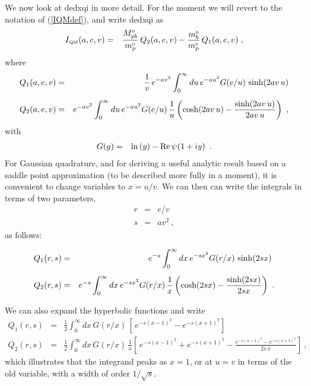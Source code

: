 \documentclass[preprint,12pt,eqsecnum,nofootinbib,amsmath,amssymb]{revtex4}
\newcommand{\smO}{{\rm\scriptscriptstyle 0}}
\newcommand{\smQM}{{\rm\scriptscriptstyle QM}}
\begin{document}
We now look at dedxqi in more detail. For the moment we
will revert to the notation of (\ref{IQMdef}), and write 
dedxqi as
\begin{eqnarray}
  I_\smQM(a,e,v)    &=& 
  \frac{M_{pb}^\smO}{m_p^\smO}\,Q_2(a,e,v) -
  \frac{m_b^\smO}{m_p^\smO}\, Q_1(a,e,v) \ ,
\end{eqnarray}
where 
\begin{eqnarray}
  Q_1(a,e,v) &=&\frac{1}{v}\,
  e^{- a v^2}
  \int_0^\infty du \, e^{-a u^2} G(e/u)\,
  \sinh(2 a v\, u)
\\[5pt]
  Q_2(a,e,v) &=&
  e^{- a v^2}
  \int_0^\infty du \, e^{-a u^2}
  G(e/u)\, \frac{1}{u} 
  \left(\cosh(2a v\,u) - {\sinh(2 a v\, u) \over 2 a v\, u} 
  \right)  \ ,
\end{eqnarray}
with
\begin{eqnarray}
  G(y) &=& 
  \ln\left(y \right) - {\rm Re} \, \psi \hskip-0.05cm 
  \left( 1 + i y \right) \ .
\end{eqnarray}
For Gaussian quadrature, and for deriving a useful analytic 
result based on a saddle point approximation (to be described
more fully in a moment), it is convenient 
to change variables to $x=u/v$. We can then can write the 
integrals in terms of two parameters,
\begin{eqnarray}
  r &=& e/v
\\
  s &=& a v^2 \ ,
\end{eqnarray}
as follows:
\begin{mathletters}
\label{qonetwodef}
\begin{eqnarray}
  Q_1(r,s) &=& e^{-s}
  \int_0^\infty dx \, e^{-s x^2} G(r/x)\, \sinh(2 s x) \
\\[5pt]
  Q_2(r,s) &=&
  e^{- s}\int_0^\infty dx \, e^{-s x^2}
  G(r/x)\, \frac{1}{x} 
  \left(\cosh(2 s x) - {\sinh(2 s x) \over 2 s x} \right)  \ .
\end{eqnarray}
\end{mathletters}
We can also expand the hyperbolic functions and write 
\begin{eqnarray}
  Q_1(r,s) &=&\frac{1}{2}
  \int_0^\infty dx \,G(r/x)\, \left[\,e^{-s(x-1)^2} -
  e^{-s(x+1)^2} \right] 
\\[5pt]
  Q_2(r,s) &=&
  \frac{1}{2}\int_0^\infty dx \, 
  G(r/x)\, \frac{1}{x} 
  \left[\,e^{-s(x-1)^2} + e^{-s(x+1)^2} - 
  \frac{e^{-s(x-1)^2} - e^{-s(x+1)^2}}{2 s\, x} \right]   \ ,
\end{eqnarray}
which illustrates that the integrand peaks as $x=1$, 
or at $u=v$ in terms of the old variable, with a width
of order $1/\sqrt{s}$. 
\end{document}
